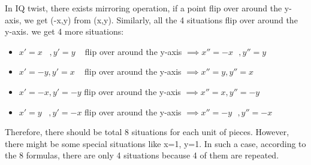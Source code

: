 In IQ twist, there exists mirroring operation, if a point flip over around the y-axis, we get  (-x,y) from (x,y). Similarly, all the 4 situations flip over around the y-axis. we get 4 more situations: 
\begin{itemize}
  \item  $x'=x\hspace{10pt}, y'=y\hspace{10pt}$    flip over around the y-axis $\implies x''=-x\hspace{8pt},y''=y$
  \item  $x'=-y, y'=x\hspace{10pt}$                flip over around the y-axis $\implies x''=y,y''=x$
  \item  $x'=-x, y'=-y$               flip over around the y-axis $\implies x''=x, y''=-y$
  \item  $x'=y\hspace{10pt},y'=-x$    flip over around the y-axis $\implies x''=-y\hspace{8pt}, y''=-x$
  \label{mirrorrotate4}
\end{itemize}
Therefore, there should be total 8 situations for each unit of pieces. However, there might be some special situations like x=1, y=1. In such a case, according to the 8 formulas, there are only 4 situations because 4 of them are repeated.
